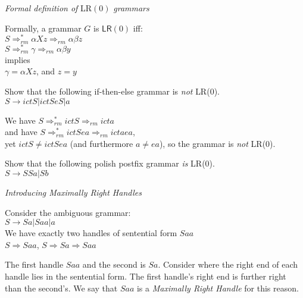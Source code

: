 \frmrule 

\textit{Formal definition of} \textsf{LR}$(0)$ \textit{grammars }

Formally, a grammar $G$ is $\textsf{LR}(0)$ iff:\\
$S \Rightarrow^{*}_{rm} \alpha X z \Rightarrow_{rm} \alpha \beta z$ \\
$S \Rightarrow^{*}_{rm} \gamma      \Rightarrow_{rm} \alpha \beta y$ \\
implies \\
$\gamma = \alpha Xz$, and $z=y$

\frmrule 



\frmrule 

\begin{example}
Show that the following if-then-else grammar is \textit{not} \textsf{LR}($0$).\\
$S \rightarrow ictS | ictSeS | a$ 

We have $S \Rightarrow^{*}_{rm} ictS \Rightarrow_{rm} icta$ \\
and have $S \Rightarrow^{*}_{rm} ictSea \Rightarrow_{rm} ictaea$, \\
yet $ictS \neq ictSea$ (and furthermore $a \neq ea$), so the grammar is 
\textit{not}  \textsf{LR}($0$).
\end{example}

\frmrule 

\begin{example}
Show that the following polish postfix grammar \textit{is} \textsf{LR}($0$).\\
$S \rightarrow SSa | Sb$ 
\end{example}

\frmrule


\textit{Introducing Maximally Right Handles }

\begin{example}
Consider the ambiguous grammar: \\
$S \rightarrow Sa | Saa | a$\\
We have exactly two handles of sentential form $Saa$\\
$S \Rightarrow Saa$, $S \Rightarrow Sa \Rightarrow Saa$ 

The first handle $Saa$ and the second is $Sa$. Consider 
where the right end of each handle lies in the sentential form. 
The first handle's right end is further right than the second's. 
We say that $Saa$ is a \textit{Maximally Right Handle} for this reason. 
\end{example}


